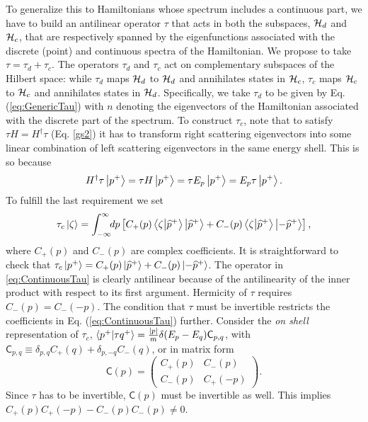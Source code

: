 To generalize this to Hamiltonians whose spectrum includes a continuous part, we have to build an antilinear operator $\tau$ that acts in both the subspaces, ${\cal H}_d$ and ${\cal H}_c$, that are respectively spanned by the eigenfunctions associated with the discrete (point) and continuous spectra of the Hamiltonian. We propose to take $\tau= \tau_d + \tau_c$. The operators $\tau_d$ and $\tau_c$ act on complementary subspaces of the Hilbert space: while $\tau_d$ maps ${\cal H}_d$ to ${\cal H}_d$ and annihilates states in ${\cal H}_c$,   $\tau_c$ maps ${\cal H}_c$ to ${\cal H}_c$ and annihilates states in ${\cal H}_d$.
Specifically, we take $\tau_d$ to be given by Eq. (\ref{eq:GenericTau}) with  $n$ denoting the eigenvectors of the Hamiltonian associated with the discrete part of the spectrum. To construct $\tau_c$, note that to satisfy $\tau H = H^\dagger \tau$ (Eq. \eqref{gs2}) it has to transform right scattering eigenvectors into some linear combination of left scattering eigenvectors in the same energy shell. This is so because
%
\begin{equation}
    H^\dagger \tau \ket{p^+} = \tau H \ket{p^+}
    = \tau E_p\ket{p^+}
    = E_p \tau \ket{p^+}.
\end{equation}
%
To fulfill the last requirement we set
%
\begin{equation}
    \tau_c \ket{\zeta} = \int_{-\infty}^{\infty}\!\! dp  \left[ C_+(p) \braket{\zeta}{\widehat{p}^+}\ket{\widehat{p}^+} + C_-(p)\braket{\zeta}{\widehat{p}^+}\ket{-\widehat{p}^+} \right],
    \label{eq:ContinuousTau}
\end{equation}
%
where $C_+(p)$ and $C_-(p)$ are complex coefficients. It is straightforward to check that $\tau_c \ket{p^+} = C_+(p)\ket{\widehat{p}^+} + C_-(p)\ket{-\widehat{p}^+}$.
The operator in \eqref{eq:ContinuousTau} is clearly antilinear because of the antilinearity of the inner product with respect to its first argument. Hermicity of $\tau$ requires $C_-(p) = C_-(-p)$. The condition that $\tau$ must be invertible restricts the coefficients in Eq. (\ref{eq:ContinuousTau}) further.
Consider the \textit{on shell} representation of $\tau_c$, $\braket{p^+}{\tau q^+} = \frac{|p|}{m}\delta(E_p-E_q) \mathsf{C}_{p,q}$, with $\mathsf{C}_{p,q} \equiv \delta_{p,q} C_+(q) + \delta_{p,-q} C_-(q)$, or in matrix form
%
\begin{equation}
\mathsf{C}(p)=
    \begin{pmatrix}
    C_+(p) & C_-(p) \\
    C_-(p) & C_+(-p)
    \end{pmatrix}.
\end{equation}
%
Since $\tau$ has to be invertible, $\mathsf{C}(p)$ must be invertible as well. This implies \linebreak  $C_+(p)C_+(-p) - C_-(p)C_-(p) \neq 0$.

